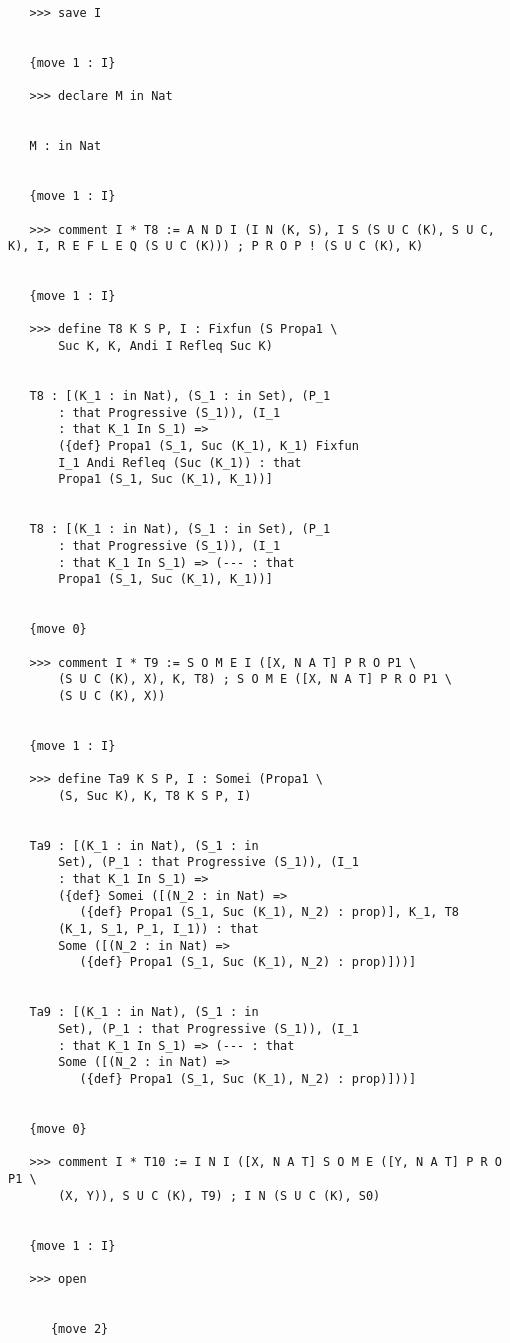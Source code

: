 \documentclass{article}
\begin{document}
\begin{verbatim}
   >>> save I


   {move 1 : I}

   >>> declare M in Nat


   M : in Nat


   {move 1 : I}

   >>> comment I * T8 := A N D I (I N (K, S), I S (S U C (K), S U C, K), I, R E F L E Q (S U C (K))) ; P R O P ! (S U C (K), K)


   {move 1 : I}

   >>> define T8 K S P, I : Fixfun (S Propa1 \
       Suc K, K, Andi I Refleq Suc K)


   T8 : [(K_1 : in Nat), (S_1 : in Set), (P_1 
       : that Progressive (S_1)), (I_1 
       : that K_1 In S_1) => 
       ({def} Propa1 (S_1, Suc (K_1), K_1) Fixfun 
       I_1 Andi Refleq (Suc (K_1)) : that 
       Propa1 (S_1, Suc (K_1), K_1))]


   T8 : [(K_1 : in Nat), (S_1 : in Set), (P_1 
       : that Progressive (S_1)), (I_1 
       : that K_1 In S_1) => (--- : that 
       Propa1 (S_1, Suc (K_1), K_1))]


   {move 0}

   >>> comment I * T9 := S O M E I ([X, N A T] P R O P1 \
       (S U C (K), X), K, T8) ; S O M E ([X, N A T] P R O P1 \
       (S U C (K), X))


   {move 1 : I}

   >>> define Ta9 K S P, I : Somei (Propa1 \
       (S, Suc K), K, T8 K S P, I)


   Ta9 : [(K_1 : in Nat), (S_1 : in 
       Set), (P_1 : that Progressive (S_1)), (I_1 
       : that K_1 In S_1) => 
       ({def} Somei ([(N_2 : in Nat) => 
          ({def} Propa1 (S_1, Suc (K_1), N_2) : prop)], K_1, T8 
       (K_1, S_1, P_1, I_1)) : that 
       Some ([(N_2 : in Nat) => 
          ({def} Propa1 (S_1, Suc (K_1), N_2) : prop)]))]


   Ta9 : [(K_1 : in Nat), (S_1 : in 
       Set), (P_1 : that Progressive (S_1)), (I_1 
       : that K_1 In S_1) => (--- : that 
       Some ([(N_2 : in Nat) => 
          ({def} Propa1 (S_1, Suc (K_1), N_2) : prop)]))]


   {move 0}

   >>> comment I * T10 := I N I ([X, N A T] S O M E ([Y, N A T] P R O P1 \
       (X, Y)), S U C (K), T9) ; I N (S U C (K), S0)


   {move 1 : I}

   >>> open


      {move 2}


\end{verbatim}
\end{document}
